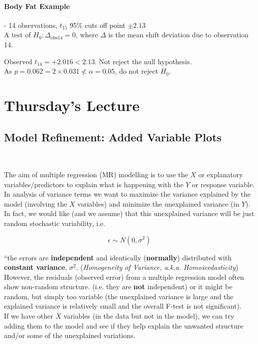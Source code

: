 \documentclass[a4paper, 11pt, twoside]{article}
\begin{document}
\paragraph{Body Fat Example} - 14 observations, $t_{15}$ 95\% cuts off point $\pm 2.13$\\

A test of $H_0: \Delta_{\text{obs}14}=0$, where $\Delta$ is the mean shift deviation due to observation 14.

Observed $t_{14}=+2.016<2.13$. Not reject the null hypothesis.\\

As $p=0.062=2\times 0.031\not < \alpha=0.05$, do not reject $H_0$.

\section{Thursday's Lecture}
\subsection{Model Refinement: Added Variable Plots}\ 

The aim of multiple regression (MR) modelling is to use the $X$ or explanatory variables/predictors to explain what is happening with the $Y$ or response variable.\\

In analysis of variance terms we want to maximize the variance explained by the model (involving the $X$ variables) and minimize the unexplained variance (in $Y$). In fact, we would like (and we assume) that this unexplained variance will be just random stochastic variability, i.e.

\[\epsilon \sim N(0, \sigma^2)\]

``the errors are \textbf{independent} and identically (\textbf{normally}) distributed with \textbf{constant variance}, $\sigma^2$. (\textit{Homogeneity of Variance, a.k.a. Homoscedasticity})\\

However, the residuals (observed error) from a multiple regression model often show non-random structure. (i.e. they are \textbf{not} independent) or it might be random, but simply too variable (the unexplained variance is large and the explained variance is relatively small and the overall F-test is not significant).\\

If we have other $X$ variables (in the data but not in the model), we can try adding them to the model and see if they help explain the unwanted structure and/or some of the unexplained variations.\\
\end{document}
